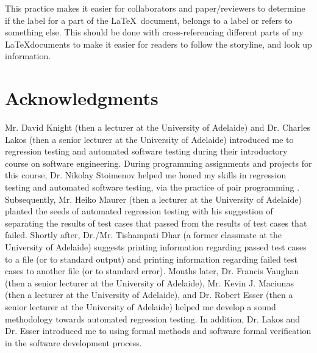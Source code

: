 \documentclass[letter,12pt]{article}
\begin{document}
This practice makes it easier for collaborators and paper/reviewers to determine if the label for a part of the \LaTeX\ document, belongs to a label or refers to something else. This should be done with cross-referencing different parts of my \LaTeX documents to make it easier for readers to follow the storyline, and look up information.














\section*{Acknowledgments}
\label{sec:Acknowledgments}


Mr. David Knight (then a lecturer at the University of Adelaide) and Dr. Charles Lakos (then a senior lecturer at the University of Adelaide) introduced me to regression testing and automated software testing during their introductory course on software engineering. During programming assignments and projects for this course, Dr. Nikolay Stoimenov helped me honed my skills in regression testing and automated software testing, via the practice of pair programming \cite{DeOrio2016,Fox2013,Oram2011,Jalote2008,Shore2008,Wiegers2002}. Subsequently, Mr. Heiko Maurer (then a lecturer at the University of Adelaide) planted the seeds of automated regression testing with his suggestion of separating the results of test cases that passed from the results of test cases that failed. Shortly after, Dr./Mr. Tishampati Dhar (a former classmate at the University of Adelaide) suggests printing information regarding passed test cases to a file (or to standard output) and printing information regarding failed test cases to another file (or to standard error). Months later, Dr. Francis Vaughan (then a senior lecturer at the University of Adelaide), Mr. Kevin J. Maciunas (then a lecturer at the University of Adelaide), and Dr. Robert Esser (then a senior lecturer at the University of Adelaide) helped me develop a sound methodology towards automated regression testing. In addition, Dr. Lakos and Dr. Esser introduced me to using formal methods and software formal verification in the software development process.
\end{document}
